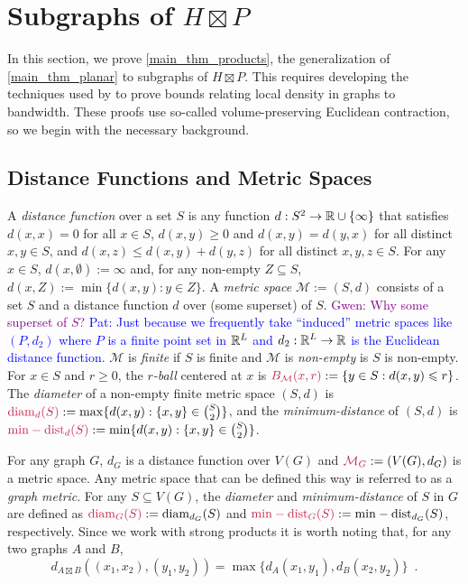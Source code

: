 \documentclass{patmorin}
\makeatletter
\renewcommand{\ge}{\geqslant}
\renewcommand{\le}{\leqslant}
\renewcommand{\geq}{\geqslant}
\newcommand{\pat}[1]{\textcolor{Blue}{Pat: #1}}
\newcommand{\gwen}[1]{\textcolor{Purple}{Gwen: #1}}
\newcommand{\defin}[1]{\emph{\textcolor{brightmaroon}{#1}}}
\def\mathcolor#1#{\@mathcolor{#1}}
\def\@mathcolor#1#2#3{%
  \protect\leavevmode
  \begingroup
    \color#1{#2}#3%
  \endgroup
}
\newcommand{\mathdefin}[1]{\mathcolor{brightmaroon}{#1}}
\DeclareMathOperator{\diam}{diam}
\DeclareMathOperator{\mindist}{min-dist}
\makeatother
\begin{document}
%


\section{\boldmath Subgraphs of $H\boxtimes P$}
\label{htimesp_section}

In this section, we prove \cref{main_thm_products}, the generalization of \cref{main_thm_planar} to subgraphs of $H\boxtimes P$.  This requires developing the techniques used by \cite{feige:approximating,rao:small} to prove bounds relating local density in graphs to bandwidth. These proofs use so-called volume-preserving Euclidean contraction, so we begin with the necessary background.

\subsection{Distance Functions and Metric Spaces}

A \defin{distance function} over a set $S$ is any function $d:S^2\to\mathbb{R}\cup\{\infty\}$ that satisfies $d(x,x)=0$ for all $x\in S$, $d(x,y)\ge 0$ and $d(x,y)=d(y,x)$ for all distinct $x,y\in S$, and $d(x,z) \le d(x,y)+d(y,z)$ for all distinct $x,y,z\in S$.  For any $x\in S$, $d(x,\emptyset):=\infty$ and, for any non-empty $Z\subseteq S$, $d(x,Z):=\min\{d(x,y):y\in Z\}$.  A \defin{metric space} $\mathcal{M}:=(S,d)$ consists of a set $S$ and a distance function $d$ over (some superset) of $S$.
\gwen{Why some superset of $S$?} \pat{Just because we frequently take ``induced'' metric spaces like $(P,d_2)$ where $P$ is a finite point set in $\mathbb{R}^L$ and $d_2:\mathbb{R}^L\to\mathbb{R}$ is the Euclidean distance function.}
$\mathcal{M}$ is \defin{finite} if $S$ is finite and $\mathcal{M}$ is \defin{non-empty} is $S$ is non-empty.  For $x\in S$ and $r\geq 0$, the \defin{$r$-ball} centered at $x$ is $\mathdefin{B_{\mathcal{M}}(x,r)}:=\{y\in S:d(x,y)\le r\}$.  The \defin{diameter} of a non-empty finite metric space $(S,d)$ is $\mathdefin{\diam_d(S)}:=\max\{d(x,y):\{x,y\}\in\binom{S}{2}\}$, and the
\defin{minimum-distance} of $(S,d)$ is $\mathdefin{\mindist_d(S)}:=\min\{d(x,y): \{x,y\}\in\binom{S}{2}\}$.

For any graph $G$, $d_G$ is a distance function over $V(G)$ and $\mathdefin{\mathcal{M}_G}:=(V(G),d_G)$ is a metric space. Any metric space that can be defined this way is referred to as a \defin{graph metric}. For any $S\subseteq V(G)$, the \defin{diameter} and \defin{minimum-distance} of $S$ in $G$ are defined as $\mathdefin{\diam_G(S)}:=\diam_{d_G}(S)$ and $\mathdefin{\mindist_G(S)}:=\mindist_{d_G}(S)$, respectively. %
Since we work with strong products it is worth noting that, for any two graphs $A$ and $B$,
\[
  d_{A\boxtimes B}((x_1,x_2),(y_1,y_2))=\max\{d_A(x_1,y_1),d_B(x_2,y_2)\} \enspace .
\]
\end{document}
